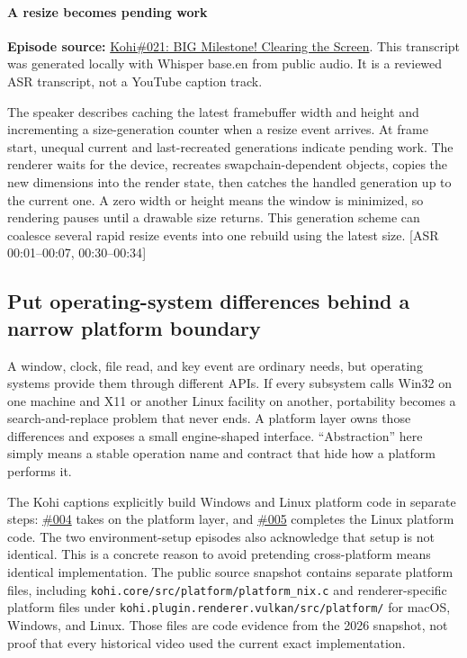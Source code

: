 \paragraph{A resize becomes pending work}\label{05-engine-i-ch013-a-resize-becomes-pending-work}

\textbf{Episode source:} \href{https://www.youtube.com/watch?v=hRL71D1f3pU}{Kohi\#021: BIG Milestone! Clearing the Screen}. This transcript was generated locally with Whisper base.en from public audio. It is a reviewed ASR transcript, not a YouTube caption track.

The speaker describes caching the latest framebuffer width and height and incrementing a size-generation counter when a resize event arrives. At frame start, unequal current and last-recreated generations indicate pending work. The renderer waits for the device, recreates swapchain-dependent objects, copies the new dimensions into the render state, then catches the handled generation up to the current one. A zero width or height means the window is minimized, so rendering pauses until a drawable size returns. This generation scheme can coalesce several rapid resize events into one rebuild using the latest size. {[}ASR 00:01--00:07, 00:30--00:34{]}

\subsection{Put operating-system differences behind a narrow platform boundary}\label{05-engine-i-ch013-put-operating-system-differences-behind-a-narrow-platform-boundary}

A window, clock, file read, and key event are ordinary needs, but operating systems provide them through different APIs. If every subsystem calls Win32 on one machine and X11 or another Linux facility on another, portability becomes a search-and-replace problem that never ends. A platform layer owns those differences and exposes a small engine-shaped interface. ``Abstraction'' here simply means a stable operation name and contract that hide how a platform performs it.

The Kohi captions explicitly build Windows and Linux platform code in separate steps: \href{https://www.youtube.com/watch?v=ojEPsZFPj2Q}{\#004} takes on the platform layer, and \href{https://www.youtube.com/watch?v=nGgvWzoCsyk}{\#005} completes the Linux platform code. The two environment-setup episodes also acknowledge that setup is not identical. This is a concrete reason to avoid pretending cross-platform means identical implementation. The public source snapshot contains separate platform files, including \texttt{kohi.core/src/platform/platform\_nix.c} and renderer-specific platform files under \texttt{kohi.plugin.renderer.vulkan/src/platform/} for macOS, Windows, and Linux. Those files are code evidence from the 2026 snapshot, not proof that every historical video used the current exact implementation.

